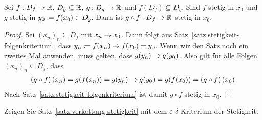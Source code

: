 \begin{satz} %
    \label{satz:verkettung-stetigkeit}
    Sei $f: D_f \rightarrow{}\mathbb{R}$, $D_g\subseteq\mathbb{R}$, $g: D_g\rightarrow{}\mathbb{R}$ und $f(D_f)\subseteq D_g$. Sind $f$ stetig in $x_0$ und $g$ stetig in $y_0\coloneqq f(x_0)\in D_g$. Dann ist $g\circ f: D_f\rightarrow{}\mathbb{R}$ stetig in $x_0$.

    \begin{proof}
        Sei $(x_n)_n\subseteq D_f$ mit $x_n\rightarrow{} x_0$. Dann folgt aus Satz~\ref{satz:stetigkeit-folgenkriterium}, dass $y_n \coloneqq f(x_n) \rightarrow{} f(x_0) = y_0$. Wenn wir den Satz noch ein zweites Mal anwenden, muss gelten, dass $g(y_n)\rightarrow{} g(y_0)$. Also gilt für alle Folgen $(x_n)_n\subseteq D_f$, dass
        \begin{align*}
        (g\circ f)
            \left(x_n\right) = g(f(x_n)) = g(y_n) \rightarrow{} g(y_0) = g(f(x_0)) = (g\circ f)\left(x_0\right)
        \end{align*}
        Nach Satz~\ref{satz:stetigkeit-folgenkriterium} ist damit $g\circ f$ stetig in $x_0$.
    \end{proof}
\end{satz}

\begin{uebung}
    Zeigen Sie Satz~\ref{satz:verkettung-stetigkeit} mit dem $\varepsilon$-$\delta$-Kriterium der Stetigkeit.
\end{uebung}

\newpage